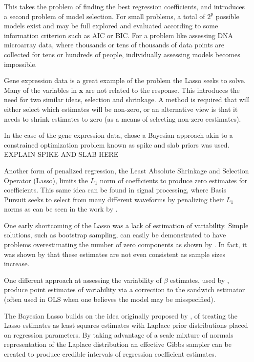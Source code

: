 \documentclass{uwstat572}
\begin{document}
This takes the problem of finding the best regression coefficients, and introduces a second problem of model selection. For small problems, a total of $2^p$ possible models exist and may be full explored and evaluated according to some information criterion such as AIC or BIC. For a problem like assessing DNA microarray data, where thousands or tens of thousands of data points are collected for tens or hundreds of people, individually assessing models becomes impossible.

Gene expression data is a great example of the problem the Lasso seeks to solve. Many of the variables in $\mathbf{x}$ are not related to the response. This introduces the need for two similar ideas, selection and shrinkage. A method is required that will either select which estimates will be non-zero, or an alternative view is that it needs to shrink estimates to zero (as a means of selecting non-zero eestimates). 

In the case of the gene expression data, \cite{ishwaran2005spike} chose a Bayesian approach akin to a constrained optimization problem known as spike and slab priors was used. EXPLAIN SPIKE AND SLAB HERE

Another form of penalized regression, the Least Absolute Shrinkage and Selection Operator (Lasso), limits the $L_1$ norm of coefficients to produce zero estimates for coefficients. This same idea can be found in signal processing, where Basis Pursuit seeks to select from many different waveforms by penalizing their $L_1$ norms as can be seen in the work by \cite{chen2001atomic}.

One early shortcoming of the Lasso was a lack of estimation of variability. Simple solutions, such as bootstrap sampling, can easily be demonstrated to have problems overestimating the number of zero components as shown by \cite{kyung2010penalized}. In fact, it was shown by \cite{shao1996bootstrap} that these estimates are not even consistent as sample sizes increase. 

One different approach at assessing the variability of $\beta$ estimates, used by \cite{fan2001variable}, produce point estimates of variability via a correction to the sandwich estimator (often used in OLS when one believes the model may be misspecified).

The Bayesian Lasso builds on the idea originally proposed by \cite{tibshirani1996regression}, of treating the Lasso estimates as least squares estimates with Laplace prior distributions placed on regression parameters. By taking advantage of a scale mixture of normals representation of the Laplace distribution an effective Gibbs sampler can be created to produce credible intervals of regression coefficient estimates.
\end{document}
